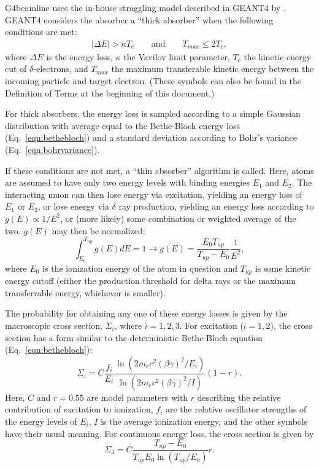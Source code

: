  \label{sec:g4blstraggling}

G4beamline uses the in-house straggling model described in GEANT4 by \cite{geant4}.  GEANT4 considers the absorber a ``thick absorber'' when the following conditions are met:
\begin{align}\label{eqn:G4StragglingThickTest}
|\Delta E| > \kappa T_c \qquad \text{and} \qquad T_{max} \le 2T_c,
\end{align}
where $\Delta E$ is the energy loss, $\kappa$ the Vavilov limit parameter, $T_c$ the kinetic energy cut of $\delta$-electrons, and $T_{max}$ the maximum transferable kinetic energy between the incoming particle and target electron. (These symbols can also be found in the Definition of Terms at the beginning of this document.)

For thick absorbers, the energy loss is sampled according to a simple Gaussian distribution with average equal to the Bethe-Bloch energy loss (Eq.~\eqref{eqn:bethebloch}) and a standard deviation according to Bohr's variance (Eq.~\eqref{eqn:bohrvariance}).

If these conditions are not met, a ``thin absorber'' algorithm is called. Here, atoms are assumed to have only two energy levels with binding energies $E_1$ and $E_2$. The interacting muon can then lose energy via excitation, yielding an energy loss of $E_1$ or $E_2$, or lose energy via $\delta$ ray production, yielding an energy loss according to $ g(E) \propto 1/E^2 $, or (more likely) some combination or weighted average of the two. $g(E)$ may then be normalized:
\begin{equation}
\int_{E_0}^{T_{up}} g(E) dE = 1 \rightarrow g(E)=\frac{E_0 T_{up}}{T_{up}-E_0}\frac{1}{E^2},
\label{eqn:G4StragglingIonization}
\end{equation}
where $E_0$ is the ionization energy of the atom in question and $T_{up}$ is some kinetic energy cutoff (either the production threshold for delta rays or the maximum transferrable energy, whichever is smaller).

The probability for obtaining any one of these energy losses is given by the macroscopic cross section, $\Sigma_i$, where $i=1,2,3$. For excitation ($i=1,2$), the cross section has a form similar to the deterministic Bethe-Bloch equation (Eq.~\eqref{eqn:bethebloch}):
\begin{equation}\label{eqn:G4StragglingCrossSectionExcitation}
\Sigma_i=C\frac{f_i}{E_i}\frac{\ln(2m_e c^2(\beta\gamma)^2/E_i)}{\ln(2m_e c^2(\beta\gamma)^2/I)}(1-r).
\end{equation}
Here, $C$ and $r=0.55$ are model parameters with $r$ describing the relative contribution of excitation to ionization, $f_i$ are the relative oscillator strengths of the energy levels of $E_i$, $I$ is the average ionization energy, and the other symbols have their usual meaning. For continuous energy loss, the cross section is given by
\begin{equation}\label{eqn:G4StragglingCrossSectionIonization}
\Sigma_3=C\frac{T_{up}-E_0}{T_{up}E_0\ln(T_{up}/E_0)}r.
\end{equation}

